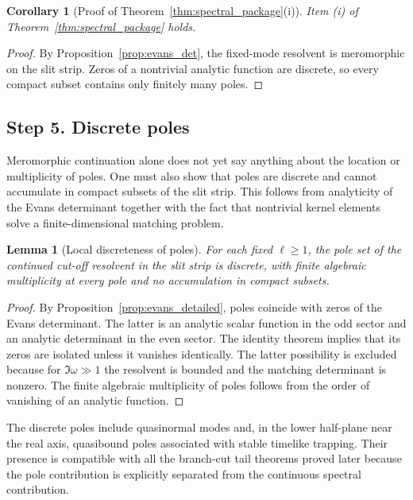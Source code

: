 \documentclass[12pt]{article}
\numberwithin{equation}{section}
\theoremstyle{plain}
\newtheorem{lemma}[theorem]{Lemma}
\newtheorem{corollary}[theorem]{Corollary}
\theoremstyle{definition}
\theoremstyle{remark}
\newcommand{\om}{\omega}
\begin{document}
\begin{corollary}[Proof of Theorem~\ref{thm:spectral_package}(i)]\label{cor:item_i}
Item \textnormal{(i)} of Theorem~\ref{thm:spectral_package} holds.
\end{corollary}

\begin{proof}
By Proposition~\ref{prop:evans_det}, the fixed-mode resolvent is meromorphic on the slit strip.  Zeros of a nontrivial analytic function are discrete, so every compact subset contains only finitely many poles.
\end{proof}

\subsection*{Step 5. Discrete poles}

Meromorphic continuation alone does not yet say anything about the location or multiplicity of poles.  One must also show that poles are discrete and cannot accumulate in compact subsets of the slit strip.  This follows from analyticity of the Evans determinant together with the fact that nontrivial kernel elements solve a finite-dimensional matching problem.

\begin{lemma}[Local discreteness of poles]\label{lem:local_discreteness}
For each fixed $\ell\ge1$, the pole set of the continued cut-off resolvent in the slit strip is discrete, with finite algebraic multiplicity at every pole and no accumulation in compact subsets.
\end{lemma}

\begin{proof}
By Proposition~\ref{prop:evans_detailed}, poles coincide with zeros of the Evans determinant.  The latter is an analytic scalar function in the odd sector and an analytic determinant in the even sector.  The identity theorem implies that its zeros are isolated unless it vanishes identically.  The latter possibility is excluded because for $\Im\om\gg1$ the resolvent is bounded and the matching determinant is nonzero.  The finite algebraic multiplicity of poles follows from the order of vanishing of an analytic function.
\end{proof}

The discrete poles include quasinormal modes and, in the lower half-plane near the real axis, quasibound poles associated with stable timelike trapping.  Their presence is compatible with all the branch-cut tail theorems proved later because the pole contribution is explicitly separated from the continuous spectral contribution.
\end{document}
